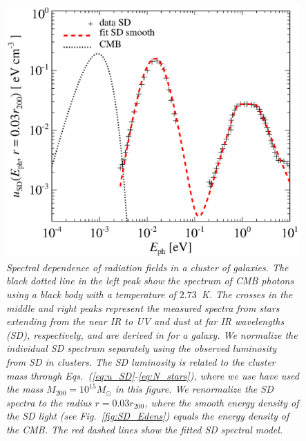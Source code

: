 \documentclass[10pt,aps,pra,reprint,amsmath,amsfonts,amssymb,showpacs,nofootinbib,floatfix]{revtex4-1}
\newcommand{\msun}{M_\odot}
\newcommand{\rvir}{r_{200}}
\newcommand{\mvir}{M_{200}}
\begin{document}
\begin{figure}%
 \includegraphics[width=0.99\columnwidth]{figures/fit.porter.v2.eps}
 \caption{\it Spectral dependence of radiation fields in a cluster of
   galaxies. The black dotted line in the left peak show the spectrum
   of CMB photons using a black body with a temperature of
   $2.73$~K. The crosses in the middle and right peaks represent the
   measured spectra from stars extending from the near IR to UV and
   dust at far IR wavelengths (SD), respectively, and are derived in
   \cite{2006ApJ...648L..29P} for a galaxy. We normalize the
   individual SD spectrum separately using the observed luminosity
   from SD in clusters. The SD luminosity is related to the cluster
   mass through Eqs.~(\ref{eq:u_SD}-\ref{eq:N_stars}), where we use
   have used the mass $\mvir=10^{15}\msun$ in this figure. We
   renormalize the SD spectra to the radius $r=0.03\rvir$, where the
   smooth energy density of the SD light (see Fig.~\ref{fig:SD_Edens})
   equals the energy density of the CMB. The red dashed lines show the
   fitted SD spectral model.}
 \label{fig:SD_spectra}
\end{figure}
\end{document}
